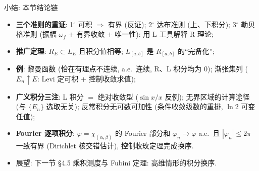 


\begin{frame}{小结: 本节结论链}

\begin{itemize}
\item \textbf{三个准则的重证}: 1$^\circ$ 可积 $\Rightarrow$ 有界 (反证);
  2$^\circ$ 达布准则 (上、下积分);
  3$^\circ$ 勒贝格准则 (振幅 $\omega_f$ $+$ 有界收敛 $+$ 唯一性):
  用 L 工具解释 R 理论;
\item \textbf{推广定理}: $R_E \subset L_E$ 且积分值相等;
  $L_{[a,b]}$ 是 $R_{[a,b]}$ 的``完备化'';
\item \textbf{例}: 黎曼函数 (恰在有理点不连续, a.e.\ 连续, R、L 积分均为 $0$);
  渐张集列 ($E_n \uparrow E$: Levi 定可积 $+$ 控制收敛求值);
\item \textbf{广义积分三注}: L 积分 $=$ 绝对收敛型 ($\sin x / x$ 反例);
  无界区域的计算途径 (与 $\{E_n\}$ 选取无关);
  反常积分无可数可加性 (条件收敛级数的重排, $\ln 2$ 可变任值);
\item \textbf{Fourier 逐项积分}: $\varphi = \chi_{(\alpha,\beta)}$ 的 Fourier 部分和
  $\varphi_n \to \varphi$ a.e.\ 且 $|\varphi_n| \leqslant 2\pi$ 一致有界 (Dirichlet 核交错估计),
  控制收玫定理完成换序.
\end{itemize}

\pause

\begin{itemize}
\item 展望: 下一节 \S 4.5 乘积测度与 Fubini 定理: 高维情形的积分换序.
\end{itemize}

\end{frame}





